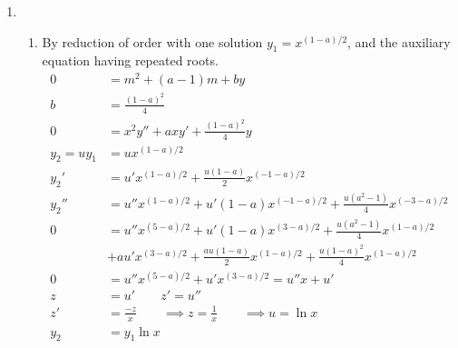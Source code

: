 \begin{enumerate}
    \item \begin{enumerate}
              \item By reduction of order with one solution $y_{1} = x^{(1-a)/2}$, and the auxiliary
                    equation having repeated roots.
                    \begin{align}
                        0              & = m^{2} + (a-1)m + by                                                               \\
                        b              & = \frac{(1-a)^{2}}{4}                                                               \\
                        0              & = x^{2}y'' + axy' + \frac{(1-a)^{2}}{4}y                                            \\
                        y_{2} = uy_{1} & = ux^{(1-a)/2}                                                                      \\
                        y_{2}'         & = u'x^{(1-a)/2} + \frac{u(1-a)}{2}x^{(-1-a)/2}                                      \\
                        y_{2}''        & = u''x^{(1-a)/2} + u'(1-a)x^{(-1-a)/2} + \frac{u(a^{2} - 1)}{4}x^{(-3-a)/2}         \\
                        0              & = u''x^{(5-a)/2} + u'(1-a)x^{(3-a)/2} + \frac{u(a^{2} - 1)}{4}x^{(1-a)/2}           \\
                                       & + au'x^{(3-a)/2} + \frac{au(1-a)}{2}x^{(1-a)/2}  + \frac{u(1-a)^{2}}{4} x^{(1-a)/2} \\
                        0              & = u'' x^{(5-a)/2} + u' x^{(3-a)/2} = u''x + u'                                      \\
                        z              & = u' \qquad z' = u''                                                                \\
                        z'             & = \frac{-z}{x}  \qquad \implies z = \frac{1}{x} \qquad \implies u = \ln x           \\
                        y_{2}          & = y_{1}\ln x
                    \end{align}


\end{enumerate}
\end{enumerate}
